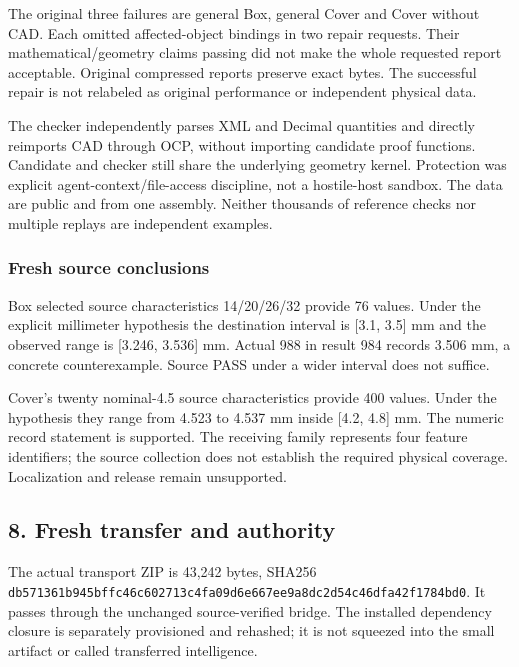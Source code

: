 \documentclass[
  10pt,
]{article}
\let\OriginalSubsection\subsection
\renewcommand{\subsection}{\needspace{6\baselineskip}\OriginalSubsection}
\begin{document}
The original three failures are general Box, general Cover and Cover
without CAD. Each omitted affected-object bindings in two repair
requests. Their mathematical/geometry claims passing did not make the
whole requested report acceptable. Original compressed reports preserve
exact bytes. The successful repair is not relabeled as original
performance or independent physical data.

The checker independently parses XML and Decimal quantities and directly
reimports CAD through OCP, without importing candidate proof functions.
Candidate and checker still share the underlying geometry kernel.
Protection was explicit agent-context/file-access discipline, not a
hostile-host sandbox. The data are public and from one assembly. Neither
thousands of reference checks nor multiple replays are independent
examples.

\hypertarget{fresh-source-conclusions}{%
\subsubsection{Fresh source
conclusions}\label{fresh-source-conclusions}}

Box selected source characteristics 14/20/26/32 provide 76 values. Under
the explicit millimeter hypothesis the destination interval is {[}3.1,
3.5{]} mm and the observed range is {[}3.246, 3.536{]} mm. Actual 988 in
result 984 records 3.506 mm, a concrete counterexample. Source PASS
under a wider interval does not suffice.

Cover's twenty nominal-4.5 source characteristics provide 400 values.
Under the hypothesis they range from 4.523 to 4.537 mm inside {[}4.2,
4.8{]} mm. The numeric record statement is supported. The receiving
family represents four feature identifiers; the source collection does
not establish the required physical coverage. Localization and release
remain unsupported.

\hypertarget{fresh-transfer-and-authority}{%
\subsection{8. Fresh transfer and
authority}\label{fresh-transfer-and-authority}}

The actual transport ZIP is 43,242 bytes, SHA256
\texttt{db571361\allowbreak{}b945bffc\allowbreak{}46c60271\allowbreak{}3c4fa09d\allowbreak{}6e667ee9\allowbreak{}a8dc2d54\allowbreak{}c46dfa42\allowbreak{}f1784bd0}.
It passes through the unchanged source-verified bridge. The installed
dependency closure is separately provisioned and rehashed; it is not
squeezed into the small artifact or called transferred intelligence.
\end{document}
